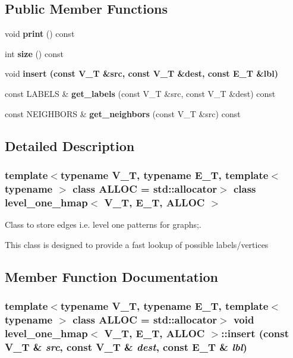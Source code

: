 \subsection*{Public Member Functions}
\begin{CompactItemize}
\item 
void \textbf{print} () const \label{classlevel__one__hmap_b6d559c67fa505b600bb63599443f32d}

\item 
int \textbf{size} () const \label{classlevel__one__hmap_b086901cb18e543ea38f67201a9c4cd1}

\item 
void \bf{insert} (const V\_\-T \&src, const V\_\-T \&dest, const E\_\-T \&lbl)
\item 
const LABELS \& \textbf{get\_\-labels} (const V\_\-T \&src, const V\_\-T \&dest) const \label{classlevel__one__hmap_050d16af752dae1ee34d0ba6dc6866cf}

\item 
const NEIGHBORS \& \textbf{get\_\-neighbors} (const V\_\-T \&src) const \label{classlevel__one__hmap_fc315ae329877b8625dd156542d4fecd}

\end{CompactItemize}


\subsection{Detailed Description}
\subsubsection*{template$<$typename V\_\-T, typename E\_\-T, template$<$ typename $>$ class ALLOC = std::allocator$>$ class level\_\-one\_\-hmap$<$ V\_\-T, E\_\-T, ALLOC $>$}

Class to store edges i.e. level one patterns for graphs;. 

This class is designed to provide a fast lookup of possible labels/vertices 



\subsection{Member Function Documentation}
\subsubsection{\setlength{\rightskip}{0pt plus 5cm}template$<$typename V\_\-T, typename E\_\-T, template$<$ typename $>$ class ALLOC = std::allocator$>$ void \bf{level\_\-one\_\-hmap}$<$ V\_\-T, E\_\-T, ALLOC $>$::insert (const V\_\-T \& {\em src}, const V\_\-T \& {\em dest}, const E\_\-T \& {\em lbl})\hspace{0.3cm}{\tt  [inline]}}\label{classlevel__one__hmap_7e64416a293d932deb50f1e0e511d132}


